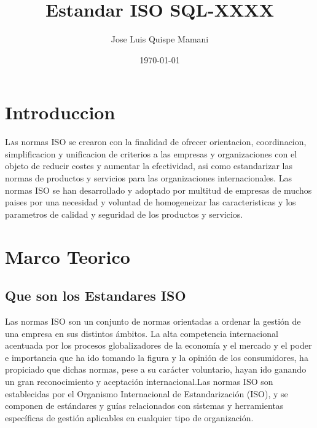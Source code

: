 \documentclass[twoside,twocolumn]{article}
\title{Estandar ISO SQL-XXXX} %
\author{Jose Luis Quispe Mamani}
\date{\today} %
\begin{document}
\maketitle


\section{Introduccion}
\lettrine[nindent=0em,lines=3]{L}as normas ISO se crearon con la finalidad de ofrecer orientacion, coordinacion, simplificacion y unificacion de criterios a las empresas y organizaciones con el objeto de reducir costes y aumentar la efectividad, asi como estandarizar las normas de productos y servicios para las organizaciones internacionales. Las normas ISO se han desarrollado y adoptado por multitud de empresas de muchos paises por una necesidad y voluntad de homogeneizar las caracteristicas y los parametros de calidad y seguridad de los productos y servicios.



\section{Marco Teorico}

\subsection{Que son los Estandares ISO}

Las normas ISO son un conjunto de normas orientadas a ordenar la gestión de una empresa en sus distintos ámbitos. La alta competencia internacional acentuada por los procesos globalizadores de la economía y el mercado y el poder e importancia que ha ido tomando la figura y la opinión de los consumidores, ha propiciado que dichas normas, pese a su carácter voluntario, hayan ido ganando un gran reconocimiento y aceptación internacional.Las normas ISO son establecidas por el Organismo Internacional de Estandarización (ISO), y se componen de estándares y guías relacionados con sistemas y herramientas específicas de gestión aplicables en cualquier tipo de organización.
\end{document}
